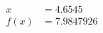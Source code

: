 \documentclass[preview]{standalone}
\begin{document}
\begin{align*}
x &= 4.6545\\f(x) &= 7.9847926
\end{align*}
\end{document}
